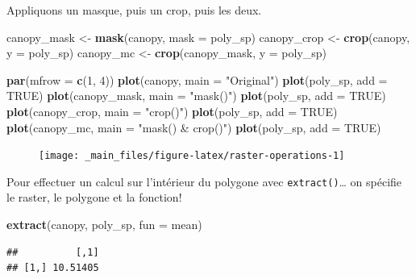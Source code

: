 \documentclass[]{book}
\newenvironment{Shaded}{\begin{snugshade}}{\end{snugshade}}
\newcommand{\DataTypeTok}[1]{\textcolor[rgb]{0.13,0.29,0.53}{#1}}
\newcommand{\DecValTok}[1]{\textcolor[rgb]{0.00,0.00,0.81}{#1}}
\newcommand{\KeywordTok}[1]{\textcolor[rgb]{0.13,0.29,0.53}{\textbf{#1}}}
\newcommand{\NormalTok}[1]{#1}
\newcommand{\OtherTok}[1]{\textcolor[rgb]{0.56,0.35,0.01}{#1}}
\newcommand{\StringTok}[1]{\textcolor[rgb]{0.31,0.60,0.02}{#1}}
\begin{document}
Appliquons un masque, puis un crop, puis les deux.

\begin{Shaded}
\begin{Highlighting}[]
\NormalTok{canopy_mask <-}\StringTok{ }\KeywordTok{mask}\NormalTok{(canopy, }\DataTypeTok{mask =}\NormalTok{ poly_sp)}
\NormalTok{canopy_crop <-}\StringTok{ }\KeywordTok{crop}\NormalTok{(canopy, }\DataTypeTok{y =}\NormalTok{ poly_sp)}
\NormalTok{canopy_mc <-}\StringTok{ }\KeywordTok{crop}\NormalTok{(canopy_mask, }\DataTypeTok{y =}\NormalTok{ poly_sp)}

\KeywordTok{par}\NormalTok{(}\DataTypeTok{mfrow =} \KeywordTok{c}\NormalTok{(}\DecValTok{1}\NormalTok{, }\DecValTok{4}\NormalTok{))}
\KeywordTok{plot}\NormalTok{(canopy, }\DataTypeTok{main =} \StringTok{"Original"}\NormalTok{)}
\KeywordTok{plot}\NormalTok{(poly_sp, }\DataTypeTok{add =} \OtherTok{TRUE}\NormalTok{)}
\KeywordTok{plot}\NormalTok{(canopy_mask, }\DataTypeTok{main =} \StringTok{"mask()"}\NormalTok{)}
\KeywordTok{plot}\NormalTok{(poly_sp, }\DataTypeTok{add =} \OtherTok{TRUE}\NormalTok{)}
\KeywordTok{plot}\NormalTok{(canopy_crop, }\DataTypeTok{main =} \StringTok{"crop()"}\NormalTok{)}
\KeywordTok{plot}\NormalTok{(poly_sp, }\DataTypeTok{add =} \OtherTok{TRUE}\NormalTok{)}
\KeywordTok{plot}\NormalTok{(canopy_mc, }\DataTypeTok{main =} \StringTok{"mask() & crop()"}\NormalTok{)}
\KeywordTok{plot}\NormalTok{(poly_sp, }\DataTypeTok{add =} \OtherTok{TRUE}\NormalTok{)}
\end{Highlighting}
\end{Shaded}

\begin{figure}

{\centering \texttt{[image: \_main\_files/figure-latex/raster-operations-1]} 

}

\caption{ }\label{fig:raster-operations}
\end{figure}

Pour effectuer un calcul sur l'intérieur du polygone avec
\texttt{extract()}\ldots{} on spécifie le raster, le polygone et la
fonction!

\begin{Shaded}
\begin{Highlighting}[]
\KeywordTok{extract}\NormalTok{(canopy, poly_sp, }\DataTypeTok{fun =}\NormalTok{ mean)}
\end{Highlighting}
\end{Shaded}

\begin{verbatim}
##          [,1]
## [1,] 10.51405
\end{verbatim}
\end{document}
